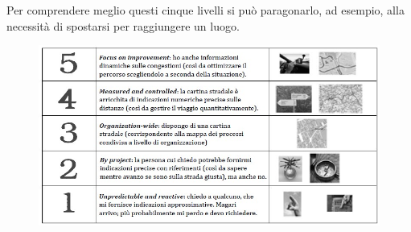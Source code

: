 \documentclass[../main]{subfiles}
\begin{document}
Per comprendere meglio questi cinque livelli si può paragonarlo, ad esempio, alla necessità di spostarsi per raggiungere un luogo.
\begin{figure}[h]
    \begin{center}
        \includegraphics[scale=0.58]{immagini/navigazione.jpg}
    \end{center}
\end{figure}
\end{document}
